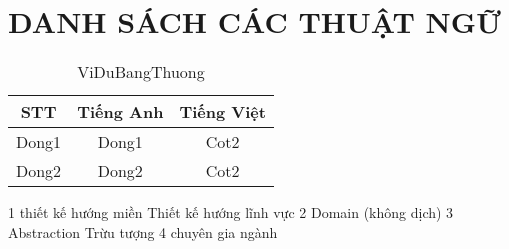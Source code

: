 \newpage
\section*{\centering DANH SÁCH CÁC THUẬT NGỮ}



\begin{table}[h]
\centering
\begin{tabular}{|c|c|c|}
\hline
STT & Tiếng Anh & Tiếng Việt \\
\hline
Dong1 & Dong1 & Cot2 \\
\hline
Dong2 & Dong2 & Cot2 \\
\hline
\end{tabular}
\caption{ViDuBangThuong}
\end{table}

\newpage


1 thiết kế hướng miền
Thiết kế hướng lĩnh vực
2 Domain (không dịch)
3 Abstraction Trừu tượng
4 chuyên gia ngành